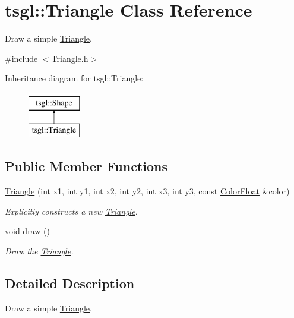 \hypertarget{classtsgl_1_1_triangle}{\section{tsgl\-:\-:\-Triangle \-Class \-Reference}
\label{classtsgl_1_1_triangle}
}


\-Draw a simple \hyperlink{classtsgl_1_1_triangle}{\-Triangle}.  




{\ttfamily \#include $<$\-Triangle.\-h$>$}

\-Inheritance diagram for tsgl\-:\-:\-Triangle\-:\begin{figure}[H]
\begin{center}
\leavevmode
\includegraphics[height=2.000000cm]{classtsgl_1_1_triangle}
\end{center}
\end{figure}
\subsection*{\-Public \-Member \-Functions}
\begin{DoxyCompactItemize}
\item 
\hyperlink{classtsgl_1_1_triangle_a5ee7f4735479c2692d1d6a2d22ba5c28}{\-Triangle} (int x1, int y1, int x2, int y2, int x3, int y3, const \hyperlink{structtsgl_1_1_color_float}{\-Color\-Float} \&color)
\begin{DoxyCompactList}\small\item\em \-Explicitly constructs a new \hyperlink{classtsgl_1_1_triangle}{\-Triangle}. \end{DoxyCompactList}\item 
void \hyperlink{classtsgl_1_1_triangle_a83b30f9f7c800146fa900d32a58fa0c7}{draw} ()
\begin{DoxyCompactList}\small\item\em \-Draw the \hyperlink{classtsgl_1_1_triangle}{\-Triangle}. \end{DoxyCompactList}\end{DoxyCompactItemize}


\subsection{\-Detailed \-Description}
\-Draw a simple \hyperlink{classtsgl_1_1_triangle}{\-Triangle}. 

